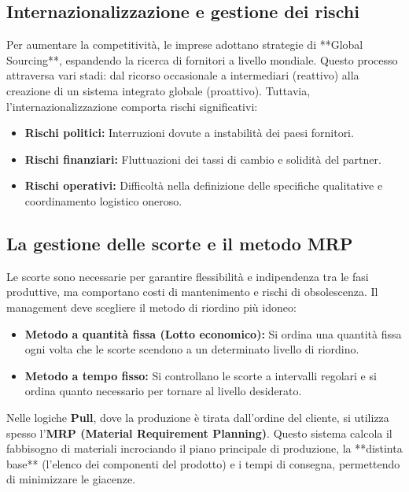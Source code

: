\documentclass[a4paper,10pt]{article}
\begin{document}
\subsection*{Internazionalizzazione e gestione dei rischi}

Per aumentare la competitività, le imprese adottano strategie di **Global Sourcing**, espandendo la ricerca di fornitori a livello mondiale. Questo processo attraversa vari stadi: dal ricorso occasionale a intermediari (reattivo) alla creazione di un sistema integrato globale (proattivo). Tuttavia, l'internazionalizzazione comporta rischi significativi:
\begin{itemize}
    \item \textbf{Rischi politici:} Interruzioni dovute a instabilità dei paesi fornitori.
    \item \textbf{Rischi finanziari:} Fluttuazioni dei tassi di cambio e solidità del partner.
    \item \textbf{Rischi operativi:} Difficoltà nella definizione delle specifiche qualitative e coordinamento logistico oneroso.
\end{itemize}

\subsection*{La gestione delle scorte e il metodo MRP}

Le scorte sono necessarie per garantire flessibilità e indipendenza tra le fasi produttive, ma comportano costi di mantenimento e rischi di obsolescenza. Il management deve scegliere il metodo di riordino più idoneo:
\begin{itemize}
    \item \textbf{Metodo a quantità fissa (Lotto economico):} Si ordina una quantità fissa ogni volta che le scorte scendono a un determinato livello di riordino.
    \item \textbf{Metodo a tempo fisso:} Si controllano le scorte a intervalli regolari e si ordina quanto necessario per tornare al livello desiderato.
\end{itemize}

Nelle logiche \textbf{Pull}, dove la produzione è tirata dall'ordine del cliente, si utilizza spesso l'\textbf{MRP (Material Requirement Planning)}. Questo sistema calcola il fabbisogno di materiali incrociando il piano principale di produzione, la **distinta base** (l'elenco dei componenti del prodotto) e i tempi di consegna, permettendo di minimizzare le giacenze.
\end{document}
